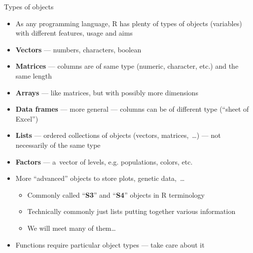 \documentclass[compress, ucs, xelatex, 11pt, xcolor=svgnames, aspectratio=169,
	hyperref={
		bookmarks=true,
		unicode=true,
		colorlinks=true,
		pdftitle={Molecular data in R},
		plainpages=false,
		pdfauthor={Vojtech Zeisek},
		pdfsubject={Course about phylogeny and evolution in R},
		pdfcreator={XeLaTeX},
		pdfkeywords={R, evolution, phylogeny, molecular data},
		linkcolor=Crimson, %
		anchorcolor=Magenta, %
		citecolor=Magenta, %
		filecolor=Magenta, %
		menucolor=Magenta, %
		urlcolor=DodgerBlue, %
		pdftex},
	url={hyphens, lowtilde} %
	]{beamer}
\begin{document}
\begin{frame}{Types of objects}
	\begin{itemize}
		\item As any programming language, R has plenty of types of objects (variables) with different features, usage and aims
		\item \textbf{Vectors} --- numbers, characters, boolean
		\item \textbf{Matrices} --- columns are of same type (numeric, character, etc.) and the same length
		\item \textbf{Arrays} --- like matrices, but with possibly more dimensions
		\item \textbf{Data frames} --- more general --- columns can be of different type (\enquote{sheet of Excel})
		\item \textbf{Lists} --- ordered collections of objects (vectors, matrices,~\ldots) --- not necessarily of the same type
		\item \textbf{Factors} --- a~vector of levels, e.g. populations, colors, etc.
		\item More \enquote{advanced} objects to store plots, genetic data,~\ldots
		\begin{itemize}
			\item Commonly called \enquote{\textbf{S3}} and \enquote{\textbf{S4}} objects in R terminology
			\item Technically commonly just lists putting together various information
			\item We will meet many of them\ldots
		\end{itemize}
	\item Functions require particular object types --- take care about it
	\end{itemize}
\end{frame}
\end{document}

